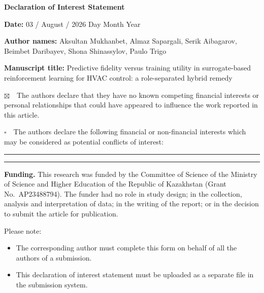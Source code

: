 \documentclass[12pt,a4paper]{article}
\begin{document}
{\large\bfseries Declaration of Interest Statement\par}

\newcommand{\subday}{03}
\newcommand{\submonth}{August}
\newcommand{\subyear}{2026}

\vspace{6pt}
\textbf{Date:} \subday{} / \submonth{} / \subyear{}
\hfill {\footnotesize Day \hspace{0.9cm} Month \hspace{0.9cm} Year}

\textbf{Author names:} Aksultan Mukhanbet, Almaz Sapargali, Serik Aibagarov, Beimbet Daribayev,
Shona Shinassylov, Paulo Trigo

\textbf{Manuscript title:} Predictive fidelity versus training utility in surrogate-based
reinforcement learning for HVAC control: a role-separated hybrid remedy

\vspace{14pt}
$\boxtimes$~~The authors declare that they have no known competing financial interests or personal
relationships that could have appeared to influence the work reported in this article.

\vspace{4pt}
$\square$~~The authors declare the following financial or non-financial interests which may be
considered as potential conflicts of interest:

\vspace{4pt}
\rule{\linewidth}{0.4pt}

\vspace{2pt}
\rule{\linewidth}{0.4pt}

\vspace{18pt}
\textbf{Funding.} This research was funded by the Committee of Science of the Ministry of Science
and Higher Education of the Republic of Kazakhstan (Grant No.~AP23488794). The funder had no role
in study design; in the collection, analysis and interpretation of data; in the writing of the
report; or in the decision to submit the article for publication.

\vfill
{\footnotesize
Please note:
\begin{itemize}\itemsep0pt \parskip0pt
\item The corresponding author must complete this form on behalf of all the authors of a submission.
\item This declaration of interest statement must be uploaded as a separate file in the submission
system.
\end{itemize}}
\end{document}
